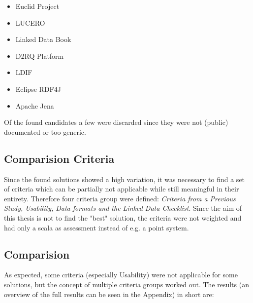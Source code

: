 \begin{itemize}
\itemsep0pt
\item Euclid Project
\item LUCERO
\item Linked Data Book
\item D2RQ Platform
\item LDIF
\item Eclipse RDF4J
\item Apache Jena
\end{itemize}

Of the found candidates a few were discarded since they were not (public) documented or too generic.

\subsection{Comparision Criteria}

Since the found solutions showed a high variation, it was necessary to find a set of criteria which can be partially not applicable while still meaningful in their entirety. Therefore four criteria group were defined: \textit{Criteria from a Previous Study, Usability, Data formats and the Linked Data Checklist}. Since the aim of this thesis is not to find the "best" solution, the criteria were not weighted and had only a scala as assessment instead of e.g. a point system.

\subsection{Comparision}

As expected, some criteria (especially Usability) were not applicable for some solutions, but the concept of multiple criteria groups worked out. The results (an overview of the full results can be seen in the Appendix) in short are:


